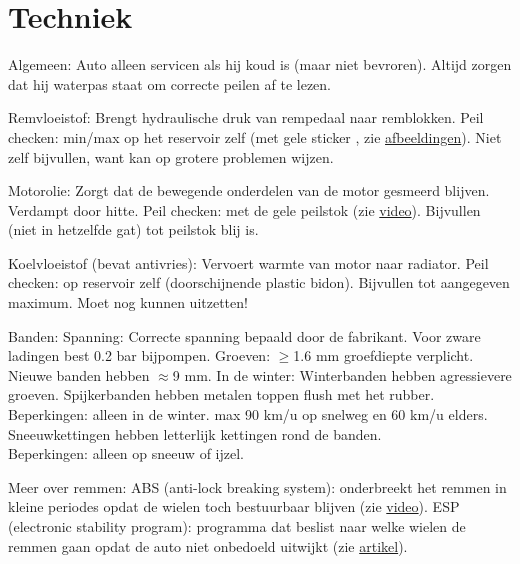 \section{Techniek}
\begin{outline}
\1 Algemeen:
	\2 Auto alleen servicen als hij koud is (maar niet bevroren).
	\2 Altijd zorgen dat hij waterpas staat om correcte peilen af te lezen.

\1 Remvloeistof:
	\2 Brengt hydraulische druk van rempedaal naar remblokken.
	\2 Peil checken: min/max op het reservoir zelf (met gele sticker \!, zie \href{https://www.holtsauto.com/prestone/news/understanding-brake-fluid-101/}{afbeeldingen}).
	\2 Niet zelf bijvullen, want kan op grotere problemen wijzen.

\1 Motorolie:
	\2 Zorgt dat de bewegende onderdelen van de motor gesmeerd blijven. Verdampt door hitte.
	\2 Peil checken: met de gele peilstok (zie \href{https://www.youtube.com/watch?v=t_vq6Z8PKZ8}{video}).	
	\2 Bijvullen (niet in hetzelfde gat) tot peilstok blij is.

\1 Koelvloeistof (bevat antivries):
	\2 Vervoert warmte van motor naar radiator.
	\2 Peil checken: op reservoir zelf (doorschijnende plastic bidon).
	\2 Bijvullen tot aangegeven maximum. Moet nog kunnen uitzetten!

\1 Banden:
	\2 Spanning:
		\3 Correcte spanning bepaald door de fabrikant.
		\3 Voor zware ladingen best 0.2 bar bijpompen.
	\2 Groeven:
		\3 $\geq$1.6 mm groefdiepte verplicht. Nieuwe banden hebben $\approx$9 mm.
		\3 In de winter:
			\4 Winterbanden hebben agressievere groeven.
			\4 Spijkerbanden hebben metalen toppen flush met het rubber. \\ Beperkingen: alleen in de winter. max 90 km/u op snelweg en 60 km/u elders.
			\4 Sneeuwkettingen hebben letterlijk kettingen rond de banden. \\ Beperkingen: alleen op sneeuw of ijzel.

\1 Meer over remmen:
	\2 ABS (anti-lock breaking system): onderbreekt het remmen in kleine periodes opdat de wielen toch bestuurbaar blijven (zie \href{https://www.youtube.com/watch?v=mlLYJW-yIIg}{video}).
	\2 ESP (electronic stability program): programma dat beslist naar welke wielen de remmen gaan opdat de auto niet onbedoeld uitwijkt (zie \href{https://www.carhelper.ch/blog/2018/01/23/abs-and-esp-what-is-the-difference/}{artikel}).
\end{outline}

